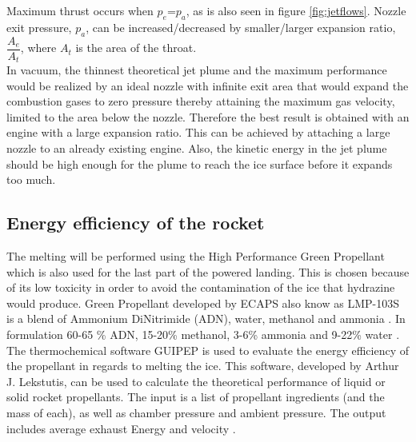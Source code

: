 \noindent
Maximum thrust occurs when $p_e$=$p_a$, as is also seen in figure \ref{fig:jetflows}. Nozzle exit pressure, $p_a$, can be increased/decreased by smaller/larger expansion ratio, $\dfrac{A_e}{A_t}$, where $A_t$ is the area of the throat. \\
In vacuum, the thinnest theoretical jet plume and the maximum performance would be realized by an ideal nozzle with infinite exit area that would expand the combustion gases to zero pressure thereby attaining the maximum gas velocity, limited to the area below the nozzle. Therefore the best result is obtained with an engine with a large expansion ratio. This can be achieved by attaching a large nozzle to an already existing engine. Also, the kinetic energy in the jet plume should be high enough for the plume to reach the ice surface before it expands too much. 

\subsection{Energy efficiency of the rocket}
The melting will be performed using the High Performance Green Propellant which is also used for the last part of the powered landing. This is chosen because of its low toxicity in order to avoid the contamination of the ice that hydrazine would produce. Green Propellant developed by ECAPS also know as LMP-103S is a blend of Ammonium DiNitrimide (ADN), water, methanol and ammonia \cite{Walter_2014}. In formulation 60-65 \% ADN, 15-20\% methanol, 3-6\% ammonia and 9-22\% water \cite{Taylor_2013}.\\

\noindent
The thermochemical software GUIPEP is used to evaluate the energy efficiency of the propellant in regards to melting the ice. This software, developed by Arthur J. Lekstutis, can be used to calculate the theoretical performance of liquid or solid rocket propellants. The input is a list of propellant ingredients (and the mass of each), as well as chamber pressure and ambient pressure. The output includes average exhaust Energy and velocity \cite{GUIPEP}. \\

